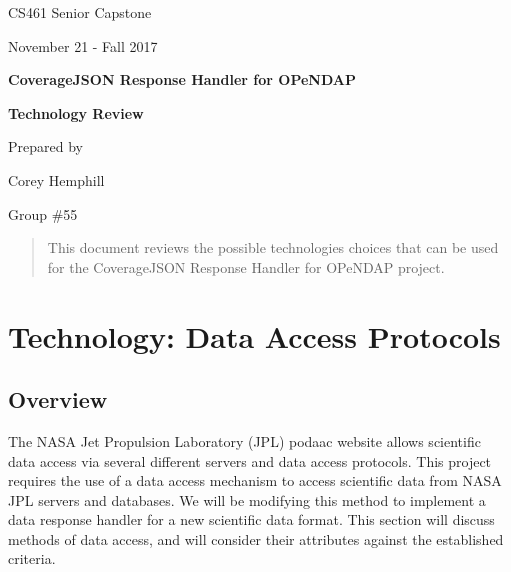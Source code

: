 \documentclass[onecolumn, draftclsnofoot,10pt, compsoc]{IEEEtran}
\def \CapstoneProjectName{CoverageJSON Response Handler for OPeNDAP}
\def \DocumentName{Technology Review}
\begin{document}
\begin{titlepage}
    \begin{singlespace}
        \hfill    
        \par\vspace{.2in}
        \centering
        \scshape{
            \huge CS461 Senior Capstone \par
            {\large November 21 - Fall 2017}\par
            \vspace{.5in}
            \textbf{\Huge\CapstoneProjectName}\par
                        \vspace{.5in}
            \textbf{\Huge\DocumentName}\par
                        \vspace{.5in}
			{\large Prepared by }\par
            {\large Corey Hemphill }\par
            {\large Group \#55 }\par
            \par\vspace{1.0in}
        }
        \begin{abstract}
        This document reviews the possible technologies choices that can be used for the CoverageJSON Response Handler for OPeNDAP project.

        \end{abstract}     
    \end{singlespace}
\end{titlepage}
\newpage
{}
\clearpage


    

\section{Technology: Data Access Protocols}

\subsection{Overview}
The NASA Jet Propulsion Laboratory (JPL) podaac website allows scientific data access via several different servers and data access protocols. This project requires the use of a data access mechanism to access scientific data from NASA JPL servers and databases. We will be modifying this method to implement a data response handler for a new scientific data format. This section will discuss methods of data access, and will consider their attributes against the established criteria.
\end{document}
